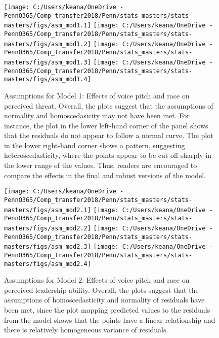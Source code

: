 \documentclass[
  english,
  man, noextraspace,floatsintext]{apa6}
\begin{document}
\begin{figure}
\texttt{[image: C:/Users/keana/OneDrive - PennO365/Comp\_transfer2018/Penn/stats\_masters/stats-masters/figs/asm\_mod1.1]} \texttt{[image: C:/Users/keana/OneDrive - PennO365/Comp\_transfer2018/Penn/stats\_masters/stats-masters/figs/asm\_mod1.2]} \texttt{[image: C:/Users/keana/OneDrive - PennO365/Comp\_transfer2018/Penn/stats\_masters/stats-masters/figs/asm\_mod1.3]} \texttt{[image: C:/Users/keana/OneDrive - PennO365/Comp\_transfer2018/Penn/stats\_masters/stats-masters/figs/asm\_mod1.4]} \caption{Assumptions for Model 1: Effects of voice pitch and race on perceived threat. Overall, the plots suggest that the assumptions of normality and homoscedasicity may not have been met. For instance, the plot in the lower left-hand corner of the panel shows that the residuals do not appear to follow a normal curve. The plot in the lower right-hand corner shows a pattern, suggesting heteroscedasticity, where the points appear to be cut off sharply in the lower range of the values. Thus, readers are encouraged to compare the effects in the final and robust versions of the model.}\label{fig:f17}
\end{figure}

\begin{figure}
\texttt{[image: C:/Users/keana/OneDrive - PennO365/Comp\_transfer2018/Penn/stats\_masters/stats-masters/figs/asm\_mod2.1]} \texttt{[image: C:/Users/keana/OneDrive - PennO365/Comp\_transfer2018/Penn/stats\_masters/stats-masters/figs/asm\_mod2.2]} \texttt{[image: C:/Users/keana/OneDrive - PennO365/Comp\_transfer2018/Penn/stats\_masters/stats-masters/figs/asm\_mod2.3]} \texttt{[image: C:/Users/keana/OneDrive - PennO365/Comp\_transfer2018/Penn/stats\_masters/stats-masters/figs/asm\_mod2.4]} \caption{Assumptions for Model 2: Effects of voice pitch and race on perceived leadership ability. Overall, the plots suggest that the assumptions of homoscedasticity and normality of residuals have been met, since the plot mapping predicted values to the residuals from the model shows that the points have a linear relationship and there is relatively homogeneous variance of residuals.}\label{fig:f18}
\end{figure}
\end{document}
